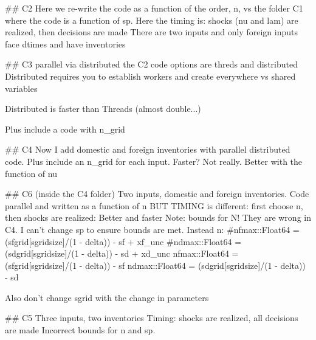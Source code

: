 
##
C2
Here we re-write the code as a function of the order, n, vs the folder C1 where the code is a function of sp.
Here the timing is: shocks (nu and lam) are realized, then decisions are made
There are two inputs and only foreign inputs face dtimes and have inventories


##
C3
parallel via distributed the C2 code
 options are threds and distributed
 Distributed requires you to establish workers and create everywhere vs shared variables

 Distributed is faster than Threads (almost double...)

 Plus include a code with n_grid 

##
C4
Now I add domestic and foreign inventories with parallel distributed code.
Plus include an n_grid for each input. Faster? Not really. Better with the function of nu

## C6 (inside the C4 folder)
Two inputs, domestic and foreign inventories.
Code parallel and written as a function of n 
BUT TIMING is different: first choose n, then shocks are realized: Better and faster
Note: bounds for N! They are wrong in C4. I can't change sp to ensure bounds are met. 
Instead n:
#nfmax::Float64 = (sfgrid[sgridsize]/(1 - delta)) - sf + xf_unc
#ndmax::Float64 = (sdgrid[sgridsize]/(1 - delta)) - sd + xd_unc
nfmax::Float64 = (sfgrid[sgridsize]/(1 - delta)) - sf
ndmax::Float64 = (sdgrid[sgridsize]/(1 - delta)) - sd

Also don't change sgrid with the change in parameters

## C5
Three inputs, two inventories
Timing: shocks are realized, all decisions are made
Incorrect bounds for n and sp.




